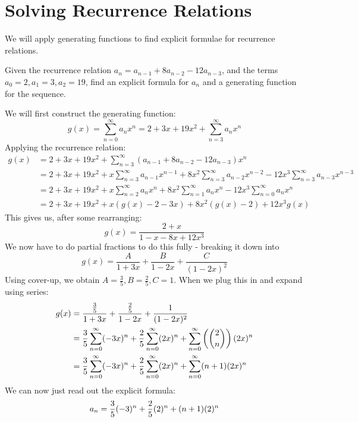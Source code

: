 \documentclass[11pt,twosided]{article}
\begin{document}
\section{Solving Recurrence Relations}
We will apply generating functions to find explicit formulae for recurrence relations. 
\begin{problem}
	Given the recurrence relation $a_n = a_{n-1} + 8a_{n-2} - 12a_{n-3}$, and the terms $a_0 = 2, a_1 = 3, a_2 = 19$, find an explicit formula for $a_n$ and a generating function for the sequence. 
\end{problem}
\begin{solution}
We will first construct the generating function: 
\[
	g(x) = \sum_{n=0}^\infty  a_n x^n = 2 + 3x + 19x^2 + \sum_{n=3}^\infty a_n x^n 
\]	
Applying the recurrence relation: 
\begin{align*}
	g(x) &= 2 + 3x + 19x^2 + \sum_{n=3}^\infty (a_{n-1} + 8a_{n-2} - 12a_{n-3}) x^n \\
	&= 2 + 3x + 19x^2 + x \sum_{n=3}^\infty a_{n-1}x^{n-1} + 8x^2 \sum_{n=3}^\infty a_{n-2}x^{n-2} - 12x^3\sum_{n=3}^\infty a_{n-3} x^{n-3} \\
	&= 2 + 3x + 19x^2 + x \sum_{n=2}^\infty a_{n}x^{n} + 8x^2 \sum_{n=1}^\infty a_{n}x^{n} - 12x^3\sum_{n=0}^\infty a_{n} x^{n} \\
	&= 2 + 3x + 19x^2 + x(g(x) - 2 - 3x) + 8x^2(g(x) - 2) + 12x^3 g(x) 
\end{align*}
This gives us, after some rearranging: 
\[
	g(x) = \frac{2+x}{1-x-8x+12x^3}
\]
We now have to do partial fractions to do this fully - breaking it down into \[
	g(x) = \frac{A}{1+3x} + \frac{B}{1-2x} + \frac{C}{(1-2x)^2}
\]
Using cover-up, we obtain $A = \frac{3}{5}, B = \frac{2}{5}, C = 1$. When we plug this in and expand using series: 
\begin{align*}
	g(x) &= \frac{\frac{3}{5}}{1+3x} + \frac{\frac{2}{5}}{1-2x} + \frac{1}{(1-2x)^2}\\
	&= \frac{3}{5} \sum_{n=0}^\infty (-3x)^n  + \frac{2}{5} \sum_{n=0}^\infty (2x)^n + \sum_{n=0}^\infty \left(\binom{2}{n}\right) (2x)^n\\
	&= \frac{3}{5} \sum_{n=0}^\infty (-3x)^n  + \frac{2}{5} \sum_{n=0}^\infty (2x)^n + \sum_{n=0}^\infty (n+1) (2x)^n
\end{align*}
We can now just read out the explicit formula: 
\[
	a_n = \frac{3}{5}(-3)^n  + \frac{2}{5}(2)^n + (n+1)(2)^n\\
\]	
	
\end{solution}
\end{document}
